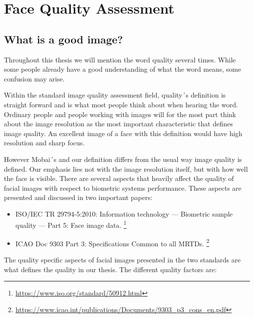 \chapter{Face Quality Assessment}
\label{chap:FQA}

\section{What is a good image?}
\label{sec:setup}
Throughout this thesis we will mention the word quality several times. While some people already have a good understanding of what the word means, some confusion may arise. 

Within the standard image quality assessment field, quality´s definition is straight forward and is what most people think about when hearing the word. Ordinary people and people working with images will for the most part think about the image resolution as the most important characteristic that defines image quality. An excellent image of a face with this definition would have high resolution and sharp focus.   

However Mobai´s and our definition differs from the usual way image quality is defined. Our emphasis lies not with the image resolution itself, but with how well the face is visible. There are several aspects that heavily affect the quality of facial images with respect to biometric systems performance. These aspects are presented and discussed in two important papers: 

\begin{itemize}
    \item ISO/IEC TR 29794-5:2010: Information technology — Biometric sample quality — Part 5: Face image data. \footnote{\url{https://www.iso.org/standard/50912.html}}
    \item ICAO Doc 9303 Part 3: Specifications Common to all MRTDs. \footnote{\url{https://www.icao.int/publications/Documents/9303_p3_cons_en.pdf}}
\end{itemize}

The quality specific aspects of facial images presented in the two standards are what defines the quality in our thesis. The different quality factors are:  

